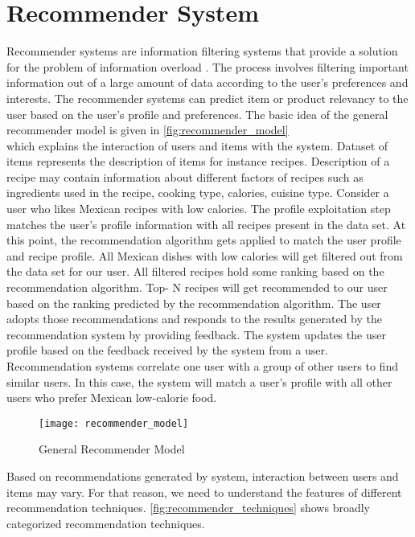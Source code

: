 \section{Recommender System}
Recommender systems are information filtering systems that provide a solution for the problem of information overload \cite{45}. The process involves filtering important information out of a large amount of data according to the user's preferences and interests. The recommender systems can predict item or product relevancy to the user based on the user's profile and preferences. The basic idea of the general recommender model is given in \autoref{fig:recommender_model} \\ which explains the interaction of users and items with the system. Dataset of items represents the description of items for instance recipes. Description of a recipe may contain information about different factors of recipes such as ingredients used in the recipe, cooking type, calories, cuisine type. Consider a user who likes Mexican recipes with low calories. The profile exploitation step matches the user's profile information with all recipes present in the data set. At this point, the recommendation algorithm gets applied to match the user profile and recipe profile. All Mexican dishes with low calories will get filtered out from the data set for our user. All filtered recipes hold some ranking based on the recommendation algorithm. Top- N recipes will get recommended to our user based on the ranking predicted by the recommendation algorithm. The user adopts those recommendations and responds to the results generated by the recommendation system by providing feedback. The system updates the user profile based on the feedback received by the system from a user. Recommendation systems correlate one user with a group of other users to find similar users. In this case, the system will match a user's profile with all other users who prefer Mexican low-calorie food. 

\begin{figure}[H]
	\centering
	\texttt{[image: recommender\_model]}
	\caption{General Recommender Model \cite{3}}
	\label{fig:recommender_model}
\end{figure}

\noindent Based on recommendations generated by system, interaction between users and items may vary. For that reason, we need to understand the features of different recommendation techniques. \autoref{fig:recommender_techniques} shows broadly categorized recommendation techniques.

